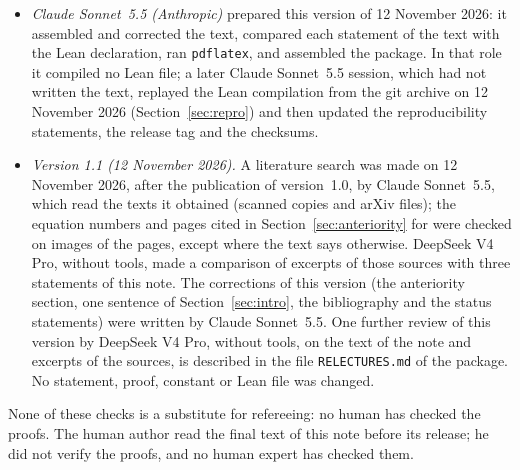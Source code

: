 \documentclass[11pt,a4paper]{article}
\theoremstyle{plain}
\theoremstyle{definition}
\theoremstyle{remark}
\numberwithin{equation}{section}
\begin{document}
\begin{itemize}
\item \emph{Claude Sonnet~5.5 (Anthropic)} prepared this version of 12 November 2026: it assembled and corrected the text, compared each statement of the text with the Lean declaration, ran \texttt{pdflatex}, and assembled the package. In that role it compiled no Lean file; a later Claude Sonnet~5.5 session, which had not written the text, replayed the Lean compilation from the git archive on 12 November 2026 (Section~\ref{sec:repro}) and then updated the reproducibility statements, the release tag and the checksums.
\item \emph{Version 1.1 (12 November 2026).} A literature search was made on 12 November 2026, after the publication of version~1.0, by Claude Sonnet~5.5, which read the texts it obtained (scanned copies and arXiv files); the equation numbers and pages cited in Section~\ref{sec:anteriority} for \cite{TY85,KT02,Kan,BS83,Mih} were checked on images of the pages, except where the text says otherwise. DeepSeek V4 Pro, without tools, made a comparison of excerpts of those sources with three statements of this note. The corrections of this version (the anteriority section, one sentence of Section~\ref{sec:intro}, the bibliography and the status statements) were written by Claude Sonnet~5.5. One further review of this version by DeepSeek V4 Pro, without tools, on the text of the note and excerpts of the sources, is described in the file \texttt{RELECTURES.md} of the package. No statement, proof, constant or Lean file was changed.
\end{itemize}
None of these checks is a substitute for refereeing: no human has checked the proofs.
The human author read the final text of this note before its release; he did not verify the proofs, and no human expert has checked them.
\end{document}
